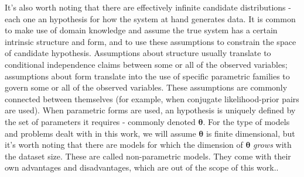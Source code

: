 It's also worth noting that there are effectively infinite candidate distributions -
each one an hypothesis for how the system at hand generates data. It is common
to make use of domain knowledge and assume the true system has a certain intrinsic
structure and form, and to use these assumptions to constrain the space of
candidate hypothesis. Assumptions about structure usually translate to conditional
independence claims between some or all of the observed variables; assumptions
about form translate into the use of specific parametric families to govern some
or all of the observed variables. These assumptions are commonly connected between
themselves (for example, when conjugate likelihood-prior pairs are used). When parametric
forms are used, an hypothesis is uniquely defined by the set of parameters it
requires - commonly denoted $\bm{\theta}$. For the type of models and problems
dealt with in this work, we will assume $\bm{\theta}$ is finite dimensional, but it's worth
noting that there are models for which the dimension of $\bm{\theta}$ \emph{grows}
with the dataset size. These are called non-parametric models. They come with
their own advantages and disadvantages, which are out of the scope of this work..

